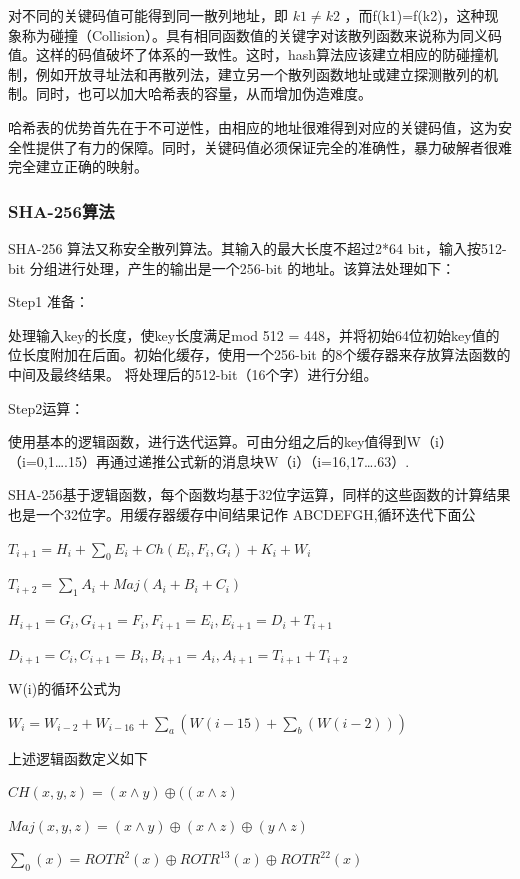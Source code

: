 \documentclass[withoutpreface,bwprint]{cumcmthesis} %
\begin{document}
对不同的关键码值可能得到同一散列地址，即 $k1\neq k2$ ，而f(k1)=f(k2)，这种现象称为碰撞（Collision）。具有相同函数值的关键字对该散列函数来说称为同义码值。这样的码值破坏了体系的一致性。这时，hash算法应该建立相应的防碰撞机制，例如开放寻址法和再散列法，建立另一个散列函数地址或建立探测散列的机制。同时，也可以加大哈希表的容量，从而增加伪造难度。

哈希表的优势首先在于不可逆性，由相应的地址很难得到对应的关键码值，这为安全性提供了有力的保障。同时，关键码值必须保证完全的准确性，暴力破解者很难完全建立正确的映射。

\subsubsection{SHA-256算法}

SHA-256 算法又称安全散列算法。其输入的最大长度不超过2*64 bit，输入按512-bit 分组进行处理，产生的输出是一个256-bit 的地址。该算法处理如下：

Step1 准备：

处理输入key的长度，使key长度满足mod 512 = 448，并将初始64位初始key值的位长度附加在后面。初始化缓存，使用一个256-bit 的8个缓存器来存放算法函数的中间及最终结果。 将处理后的512-bit（16个字）进行分组。

Step2运算：

使用基本的逻辑函数，进行迭代运算。可由分组之后的key值得到W（i）（i=0,1….15）再通过递推公式新的消息块W（i）（i=16,17….63）.

SHA-256基于逻辑函数，每个函数均基于32位字运算，同样的这些函数的计算结果也是一个32位字。用缓存器缓存中间结果记作 ABCDEFGH,循环迭代下面公

$T_{i+1}=H_{i}+\sum_0{E_{i}}+Ch(E_{i},F_{i},G_{i})+K_{i}+W_{i}$

$T_{i+2}=\sum_1{A_{i}+Maj(A_{i}+B_{i}+C_{i})}$

$H_{i+1}=G_{i},G_{i+1}=F_{i},F_{i+1}=E_{i},E_{i+1}=D_{i}+T_{i+1}$

$D_{i+1}=C_{i},C_{i+1}=B_{i},B_{i+1}=A_{i},A_{i+1}=T_{i+1}+T_{i+2}$

W(i)的循环公式为

$W_{i}=W_{i-2}+W_{i-16}+\sum_a(W(i-15)+\sum_b(W(i-2)))$

上述逻辑函数定义如下

$CH( x, y, z) = (x\land y) \oplus  ( (x\land z)$

$Maj( x, y, z) = (x \land y) \oplus (x \land z) \oplus (y \land z)$

$\sum_0(x) = ROTR^{2}(x) \oplus ROTR^{13}(x) \oplus ROTR^{22}(x)$
\end{document}
